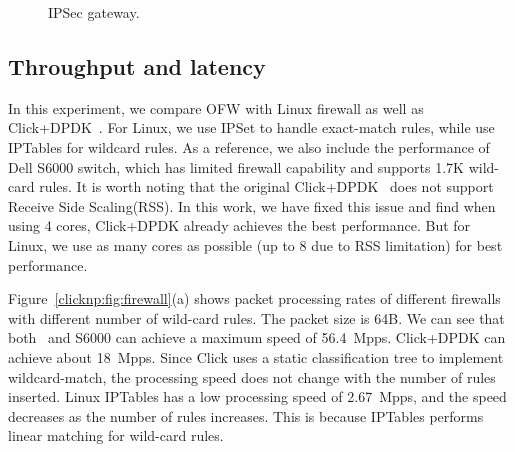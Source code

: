 \begin{figure}[t!]
		\centering
		
		\caption{IPSec gateway. }
		
		\label{clicknp:fig:IPSec}
\end{figure}

\subsection{Throughput and latency}


In this experiment, we compare OFW with Linux firewall as well as Click+DPDK~\cite{barbette2015fast}.
For Linux, we use IPSet to handle exact-match rules, while use IPTables for wildcard rules.
As a reference, we also include the performance of Dell S6000 switch, which has limited firewall capability 
and supports 1.7K wild-card rules.
It is worth noting that the original Click+DPDK~\cite{barbette2015fast} does not support Receive Side Scaling(RSS).
In this work, we have fixed this issue and find when using 4 cores, Click+DPDK already achieves the best performance. 
But for Linux, we use as many cores as possible (up to 8 due to RSS limitation) for best performance. 

Figure~\ref{clicknp:fig:firewall}(a) shows packet processing rates of different firewalls with different number of wild-card rules.
The packet size is 64B.
We can see that both \name\ and S6000 can achieve a maximum speed of 56.4~Mpps. 
Click+DPDK can achieve about 18~Mpps. 
Since Click uses a static classification tree to implement wildcard-match, the processing speed 
does not change with the number of rules inserted. 
%
Linux IPTables has a low processing speed of 2.67~Mpps, and the speed decreases as the number of rules
increases. This is because IPTables performs linear matching for wild-card rules.

